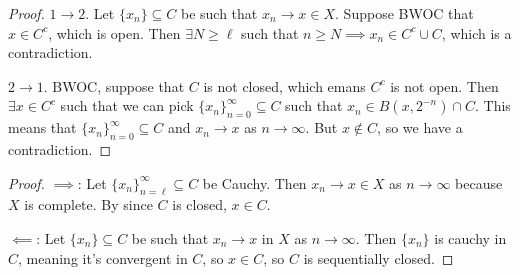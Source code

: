 \documentclass{report}
\begin{document}

\begin{proof}
    $1 \to 2$. Let $\{x_n\} \subseteq C$ be such that $x_n \to x \in X$. Suppose BWOC that $x \in C^c$, which is open. Then $\exists N \geq \ell$ such that $n \geq N \implies x_n \in C^c \cup C$, which is a contradiction.

    $2 \to 1$. BWOC, suppose that $C$ is not closed, which emans $C^c$ is not open. Then $\exists x \in C^c$ such that we can pick $\{x_n \}_{n = 0}^\infty \subseteq C$ such that $x_n \in B(x, 2^{-n}) \cap C$. This means that $\{x_n \}_{n = 0}^\infty \subseteq C$ and $x_n \to x$ as $n \to \infty$. But $x \notin C$, so we have a contradiction. 
\end{proof}

\begin{proof}
    $\implies$: Let $\{x_n\}_{n = \ell}^\infty \subseteq C$ be Cauchy. Then $x_n \to x \in X$ as $n \to \infty$ because $X$ is complete. By since $C$ is closed, $x \in C$.

    $\impliedby$: Let $\{x_n \} \subseteq C$ be such that $x_n \to x$ in $X$ as $n \to \infty$. Then $\{x _n \}$ is cauchy in $C$, meaning it's convergent in $C$, so $x \in C$, so $C$ is sequentially closed. 
\end{proof}
\end{document}
